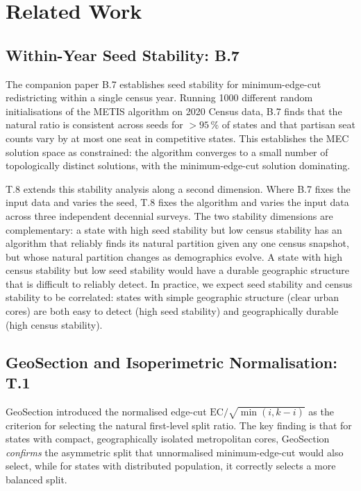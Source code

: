 \section{Related Work}
\label{sec:related}

\subsection{Within-Year Seed Stability: B.7}

The companion paper B.7 \citep{b7paper} establishes seed stability for
minimum-edge-cut redistricting within a single census year.
Running 1000 different random initialisations of the METIS algorithm on
2020 Census data, B.7 finds that the natural ratio is consistent across seeds
for $>95\,\%$ of states and that partisan seat counts vary by at most one seat
in competitive states.
This establishes the MEC solution space as constrained: the algorithm converges
to a small number of topologically distinct solutions, with the minimum-edge-cut
solution dominating.

T.8 extends this stability analysis along a second dimension.
Where B.7 fixes the input data and varies the seed, T.8 fixes the algorithm
and varies the input data across three independent decennial surveys.
The two stability dimensions are complementary: a state with high seed stability
but low census stability has an algorithm that reliably finds its natural
partition given any one census snapshot, but whose natural partition changes as
demographics evolve.
A state with high census stability but low seed stability would have a durable
geographic structure that is difficult to reliably detect.
In practice, we expect seed stability and census stability to be correlated:
states with simple geographic structure (clear urban cores) are both easy to
detect (high seed stability) and geographically durable (high census stability).

\subsection{GeoSection and Isoperimetric Normalisation: T.1}

GeoSection \citep{b8paper} introduced the normalised edge-cut
$\mathrm{EC}/\sqrt{\min(i,k-i)}$ as the criterion for selecting the natural
first-level split ratio.
The key finding is that for states with compact, geographically isolated
metropolitan cores, GeoSection \emph{confirms} the asymmetric split that
unnormalised minimum-edge-cut would also select, while for states with
distributed population, it correctly selects a more balanced split.

